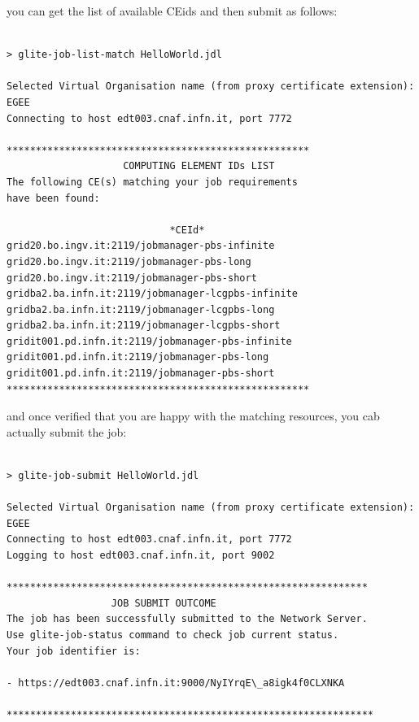 you can get the list of available CEids and then submit as follows: 

\smallskip
\begin{scriptsize}
\begin{verbatim}

> glite-job-list-match HelloWorld.jdl
   
Selected Virtual Organisation name (from proxy certificate extension): EGEE   
Connecting to host edt003.cnaf.infn.it, port 7772

****************************************************
                    COMPUTING ELEMENT IDs LIST
The following CE(s) matching your job requirements 
have been found:

                            *CEId*
grid20.bo.ingv.it:2119/jobmanager-pbs-infinite
grid20.bo.ingv.it:2119/jobmanager-pbs-long
grid20.bo.ingv.it:2119/jobmanager-pbs-short
gridba2.ba.infn.it:2119/jobmanager-lcgpbs-infinite
gridba2.ba.infn.it:2119/jobmanager-lcgpbs-long
gridba2.ba.infn.it:2119/jobmanager-lcgpbs-short
gridit001.pd.infn.it:2119/jobmanager-pbs-infinite
gridit001.pd.infn.it:2119/jobmanager-pbs-long
gridit001.pd.infn.it:2119/jobmanager-pbs-short
****************************************************

\end{verbatim}
\end{scriptsize}
\smallskip

and once verified that you are happy with the matching resources, you cab actually submit the job:

\smallskip
\begin{scriptsize}
\begin{verbatim}

> glite-job-submit HelloWorld.jdl

Selected Virtual Organisation name (from proxy certificate extension): EGEE
Connecting to host edt003.cnaf.infn.it, port 7772
Logging to host edt003.cnaf.infn.it, port 9002

**************************************************************
                  JOB SUBMIT OUTCOME
The job has been successfully submitted to the Network Server.
Use glite-job-status command to check job current status. 
Your job identifier is:

- https://edt003.cnaf.infn.it:9000/NyIYrqE\_a8igk4f0CLXNKA

***************************************************************

\end{verbatim}
\end{scriptsize}
\smallskip


